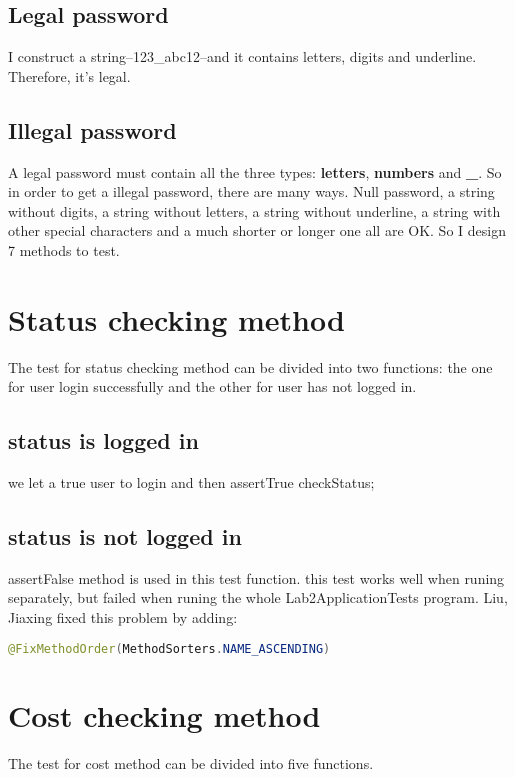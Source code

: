 \documentclass[a4paper]{report}
\begin{document}
\subsection{Legal password}
\par I construct a string--123\_abc12--and it contains letters, digits and underline. Therefore, it's legal.
\subsection{Illegal password}
\par A legal password must contain all the three types: \textbf{letters}, \textbf{numbers} and \textbf{\_}. So in order to get a illegal password, there are many ways. Null password, a string without digits, a string without letters, a string without underline, a string with other special characters and a much shorter or longer one all are OK. So I design 7 methods to test. 

\section{Status checking method}
\par The test for status checking method can be divided into two functions: the one for user login successfully and the other for user has not logged in.
\subsection{status is logged in }
\par we let a true user to login and then assertTrue checkStatus;

\subsection{status is not logged in}
\par assertFalse method is used in this test function.
this test works well when runing separately, but failed when runing the whole Lab2ApplicationTests program.
Liu, Jiaxing fixed this problem by adding:
\begin{lstlisting}[language=java]
    @FixMethodOrder(MethodSorters.NAME_ASCENDING)
\end{lstlisting}

\section{Cost checking method}
\par The test for cost method can be divided into five functions.
\end{document}
